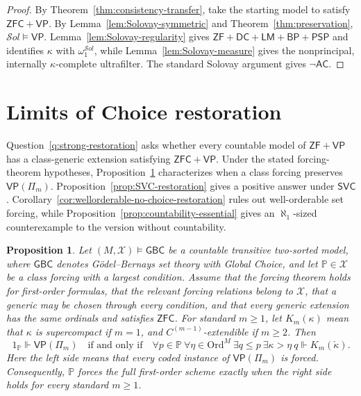 \documentclass[11pt,a4paper]{amsart}
\newcommand{\VP}{\mathsf{VP}}
\newcommand{\AC}{\mathsf{AC}}
\newcommand{\ZF}{\mathsf{ZF}}
\newcommand{\ZFC}{\mathsf{ZFC}}
\newcommand{\GBC}{\mathsf{GBC}}
\newcommand{\Ord}{\mathrm{Ord}}
\newcommand{\DC}{\mathsf{DC}}
\newcommand{\LM}{\mathsf{LM}}
\newcommand{\BP}{\mathsf{BP}}
\newcommand{\PSP}{\mathsf{PSP}}
\theoremstyle{plain}
\newtheorem{proposition}[theorem]{Proposition}
\theoremstyle{definition}
\theoremstyle{remark}
\begin{document}
\begin{proof}
By Theorem~\ref{thm:consistency-transfer}, take the starting model to satisfy $\ZFC+\VP$.  By Lemma~\ref{lem:Solovay-symmetric} and Theorem~\ref{thm:preservation},
$\mathcal S\!ol\models\VP$.  Lemma~\ref{lem:Solovay-regularity} gives $\ZF+\DC+\LM+\BP+\PSP$ and identifies $\kappa$ with $\omega_1^{\mathcal S\!ol}$, while Lemma~\ref{lem:Solovay-measure} gives the nonprincipal, internally $\kappa$-complete ultrafilter.  The standard Solovay argument gives $\neg\AC$.
\end{proof}

\begingroup

\section{{Limits of Choice restoration}}\label{sec:class-forcing}

Question~\ref{q:strong-restoration} asks whether every countable model of $\ZF+\VP$ has a class-generic extension satisfying $\ZFC+\VP$.  Under the stated forcing-theorem hypotheses, Proposition~\ref{prop:class-forcing-criteria} characterizes when a class forcing preserves $\VP(\Pi_m)$.  Proposition~\ref{prop:SVC-restoration} gives a positive answer under $\mathsf{SVC}$.  Corollary~\ref{cor:wellorderable-no-choice-restoration} rules out well-orderable set forcing, while Proposition~\ref{prop:countability-essential} gives an $\aleph_1$-sized counterexample to the version without countability.

\begingroup

\begin{proposition}\label{prop:class-forcing-criteria}
Let $(M,\mathcal X)\models\GBC$ be a countable transitive two-sorted model, {where $\GBC$ denotes G\"odel--Bernays set theory with Global Choice}, and let $\mathbb P\in\mathcal X$ be a class forcing with a largest condition.  Assume that the forcing theorem holds for first-order formulas, that the relevant forcing relations belong to $\mathcal X$, that a generic may be chosen through every condition, and that every generic extension has the same ordinals and satisfies $\ZFC$.  For standard $m\geq1$, let $K_m(\kappa)$ mean that $\kappa$ is supercompact if $m=1$, and $C^{(m-1)}$-extendible if $m\geq2$.  Then
\[
1_{\mathbb P}\Vdash\VP(\Pi_m)\quad\text{if and only if}\quad
\forall p\in\mathbb P\ \forall\eta\in\Ord^M\ 
\exists q\leq p\ \exists\kappa>\eta\ 
q\Vdash K_m(\check\kappa).
\]
Here the left side means that every coded instance of $\VP(\Pi_m)$ is forced.  Consequently, $\mathbb P$ forces the full first-order scheme exactly when the right side holds for every standard $m\geq1$.
\end{proposition}
\end{document}
